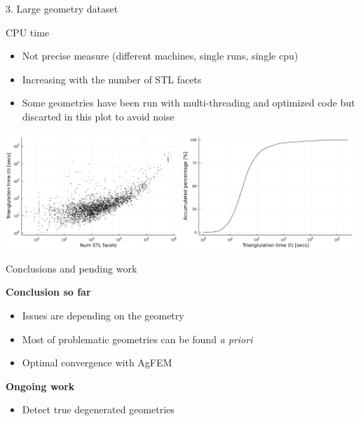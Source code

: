 \documentclass{beamer}
\begin{document}
\begin{frame}{3. Large geometry dataset}

  \begin{block}{CPU time}
  \begin{itemize}
    \item
      Not precise measure (different machines, single runs, single cpu)
    \item
      Increasing with the number of STL facets
    \item
      Some geometries have been run with multi-threading and optimized code but discarted in this plot to avoid noise
  \end{itemize}
  \end{block}

  \includegraphics[width=0.49\textwidth]{../analysis/plots/num_stl_facets_time}
  \includegraphics[width=0.49\textwidth]{../analysis/plots/histogram_time}
\end{frame}

\begin{frame}{Conclusions and pending work}

  \textbf{Conclusion so far}
  \begin{itemize}
    \item
      Issues are depending on the geometry
    \item
      Most of problematic geometries can be found \textit{a priori}
    \item
      Optimal convergence with AgFEM
  \end{itemize}
  \textbf{Ongoing work}
  \begin{itemize}
    \item
      Detect true degenerated geometries
  \end{itemize}


\end{frame}
\end{document}
